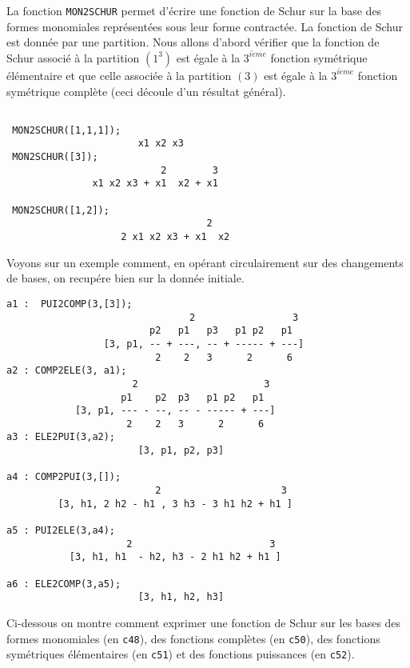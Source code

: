 La fonction {\tt MON2SCHUR} permet d'\'ecrire une fonction
de Schur sur la base des formes monomiales 
repr\'esent\'ees sous leur forme contract\'ee. La fonction de Schur
est donn\'ee par une partition. Nous allons d'abord 
v\'erifier que la fonction de Schur associ\'e \`a la
partition $(1^3)$ est \'egale \`a la $3^{i\grave{e}me}$
fonction sym\'etrique \'el\'ementaire et que celle associ\'ee
\`a la partition $(3)$ est \'egale \`a la $3^{i\grave{e}me}$ fonction
sym\'etrique compl\`ete (ceci d\'ecoule d'un r\'esultat g\'en\'eral).
\small
\begin{verbatim}

 MON2SCHUR([1,1,1]);
                       x1 x2 x3
 MON2SCHUR([3]);
                           2        3
               x1 x2 x3 + x1  x2 + x1

 MON2SCHUR([1,2]);
                                   2
                    2 x1 x2 x3 + x1  x2
\end{verbatim}
\normalsize
Voyons sur un exemple comment, en op\'erant circulairement sur des changements
de bases, on recup\'ere bien sur la donn\'ee initiale.
\small
\begin{verbatim}
a1 :  PUI2COMP(3,[3]);
                                2                 3
                         p2   p1   p3   p1 p2   p1
                 [3, p1, -- + ---, -- + ----- + ---]
                          2    2   3      2      6
a2 : COMP2ELE(3, a1);
                      2                      3
                    p1    p2  p3   p1 p2   p1
            [3, p1, --- - --, -- - ----- + ---]
                     2    2   3      2      6
a3 : ELE2PUI(3,a2);
                       [3, p1, p2, p3]

a4 : COMP2PUI(3,[]);
                          2                     3
         [3, h1, 2 h2 - h1 , 3 h3 - 3 h1 h2 + h1 ]

a5 : PUI2ELE(3,a4);
                     2                        3
           [3, h1, h1  - h2, h3 - 2 h1 h2 + h1 ]

a6 : ELE2COMP(3,a5);
                       [3, h1, h2, h3]
\end{verbatim}
\normalsize
Ci-dessous on montre comment exprimer une fonction de Schur sur les
bases des formes monomiales (en {\tt c48}), des fonctions compl\`etes
(en {\tt c50}), des fonctions sym\'etriques \'el\'ementaires (en {\tt c51})
et des fonctions puissances (en {\tt c52}).
\small

